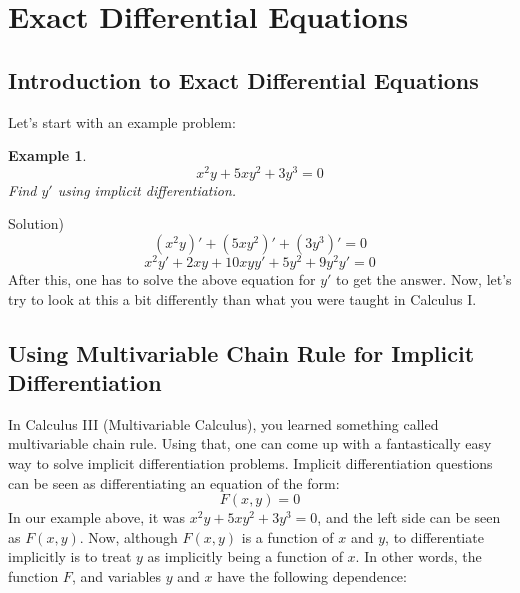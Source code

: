 \documentclass[12pt]{report}
\newtheorem{ex}{Example}[section]
\begin{document}
\section{Exact Differential Equations}

\subsection*{Introduction to Exact Differential Equations}

Let's start with an example problem:
\begin{ex}
$$x^2 y +5xy^2 +3y^3 =0 $$
Find $y'$ using implicit differentiation.
\end{ex}
Solution)
$$\left(x^2 y\right)' +\left(5xy^2\right)' +\left(3y^3\right)' =0 $$
$$x^2 y' +2xy + 10xy y' + 5y^2 + 9y^2 y' =0 $$
 After this, one has to solve the above equation for $y'$ to get the answer. Now, let's try to look at this a bit differently than what you were taught in Calculus I.


\subsection*{Using Multivariable Chain Rule for Implicit Differentiation }
In Calculus III (Multivariable Calculus), you learned something called multivariable chain rule. Using that, one can come up with a fantastically easy way to solve implicit differentiation problems.
Implicit differentiation questions can be seen as differentiating an equation of the form:
$$F(x,y)=0$$
In our example above, it was $x^2 y +5xy^2 +3y^3 =0 $, and the left side can be seen as $F(x,y)$. Now, although $F(x,y)$ is a function of $x$ and $y$, to differentiate implicitly is to treat $y$ as implicitly being a function of $x$. In other words, the function $F$, and variables $y$ and $x$ have the following dependence:
\begin{center}
\end{center}
\end{document}
